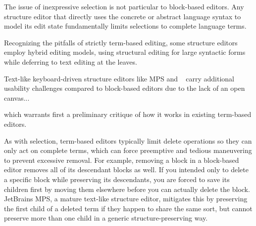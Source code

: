 The issue of inexpressive selection is not particular to
block-based editors.
Any structure editor that directly uses the
concrete or abstract language syntax to model
its edit state fundamentally limits selections to complete
language terms.


Recognizing the pitfalls of strictly term-based
editing, some structure editors
employ hybrid editing models, using structural editing
for large syntactic forms while deferring to text
editing at the leaves.


Text-like keyboard-driven structure editors
like MPS and \tylr~ carry additional usability challenges
compared to block-based editors due to the lack of an
open canvas...




which warrants first a preliminary critique of how it
works in existing term-based editors.

As with selection, term-based editors typically
limit delete operations so they can only act on
complete terms, which can force preemptive and tedious
maneuvering to prevent excessive removal.
For example, removing a block in a block-based editor
removes all of its descendant blocks as well.
If you intended only to delete a specific block
while preserving its descendants, you are forced
to save its children first by moving them elsewhere
before you can actually delete the block.
JetBrains MPS, a mature text-like structure editor,
mitigates this by preserving the first child of a deleted term
if they happen to share the same sort,
but cannot preserve more than one child in a generic
structure-preserving way.

